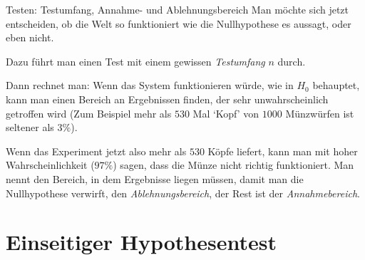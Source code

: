\begin{bla}
{Testen: Testumfang, Annahme- und Ablehnungsbereich}
  Man möchte sich jetzt entscheiden, ob die Welt so funktioniert wie die Nullhypothese es aussagt, oder eben nicht.

  Dazu führt man einen Test mit einem gewissen \emph{Testumfang} $n$ durch.

  Dann rechnet man: Wenn das System funktionieren würde, wie in $H_0$ behauptet, kann man einen Bereich an Ergebnissen finden, der sehr unwahrscheinlich getroffen wird (Zum Beispiel mehr als \( 530 \) Mal `Kopf' von \( 1000 \) Münzwürfen ist seltener als \( 3 \% \)).

  Wenn das Experiment jetzt also mehr als \( 530 \) Köpfe liefert, kann man mit hoher Wahrscheinlichkeit (\( 97 \% \)) sagen, dass die Münze nicht richtig funktioniert.
  Man nennt den Bereich, in dem Ergebnisse liegen müssen, damit man die Nullhypothese verwirft, den \emph{Ablehnungsbereich}, der Rest ist der \emph{Annahmebereich}.
\end{bla}

\section{Einseitiger Hypothesentest}

